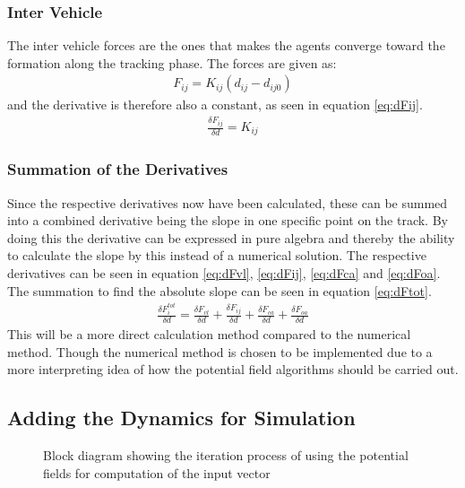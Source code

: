 \subsubsection{Inter Vehicle}
The inter vehicle forces are the ones that makes the agents converge toward the formation along the tracking phase. The forces are given as:
\begin{align}
F_{ij} = K_{ij}(d_{ij}-d_{ij0})
\end{align}
and the derivative is therefore also a constant, as seen in equation \ref{eq:dFij}.
\begin{align}
\frac{\delta F_{ij}}{\delta d} = K_{ij}
\label{eq:dFij}
\end{align}

\subsubsection{Summation of the Derivatives}
Since the respective derivatives now have been calculated, these can be summed into a combined derivative being the slope in one specific point on the track. By doing this the derivative can be expressed in pure algebra and thereby the ability to calculate the slope by this instead of a numerical solution. The respective derivatives can be seen in equation \ref{eq:dFvl}, \ref{eq:dFij}, \ref{eq:dFca} and \ref{eq:dFoa}. The summation to find the absolute slope can be seen in equation \ref{eq:dFtot}.
\begin{align}
\frac{\delta F^{tot}_{i}}{\delta d} = \frac{\delta F_{vl}}{\delta d} + \frac{\delta F_{ij}}{\delta d} + \frac{\delta F_{ca}}{\delta d} + \frac{\delta F_{oa}}{\delta d}
\label{eq:dFtot}
\end{align}
This will be a more direct calculation method compared to the numerical method. Though the numerical method is chosen to be implemented due to a more interpreting idea of how the potential field algorithms should be carried out.

\subsection{Adding the Dynamics for Simulation}

\begin{figure}[htbp]
\centering

\caption{Block diagram showing the iteration process of using the
potential fields for computation of the input vector}
\label{fig:potentialfield_block}
\end{figure}

